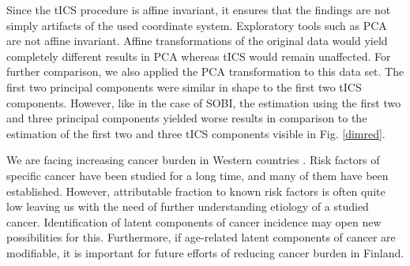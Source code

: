 \documentclass{llncs}
\begin{document}
Since the  tICS procedure is affine invariant, it ensures that the findings are not simply artifacts of the used coordinate system. Exploratory tools such as PCA are not affine invariant.
Affine transformations of the original data would yield completely different results in PCA whereas tICS would remain unaffected. For further comparison, we also applied the PCA transformation to this data set.  The first two principal components were similar in shape to the first two tICS components. However, like in the case of SOBI, the estimation using the first two and three principal components yielded worse results in comparison to the estimation of the first two and three tICS components visible in  Fig. \ref{dimred}.








We are facing increasing cancer burden in Western countries \cite{parkin2011}. Risk factors of  specific cancer have been studied for a long time, and many of them have been established. However, attributable fraction to known risk factors is often quite low leaving us with the need of further understanding etiology of a studied cancer. Identification of latent components of cancer incidence may open new possibilities for this. Furthermore, if age-related latent components of cancer are modifiable, it is important for future efforts of reducing cancer burden in Finland. 





\end{document}
